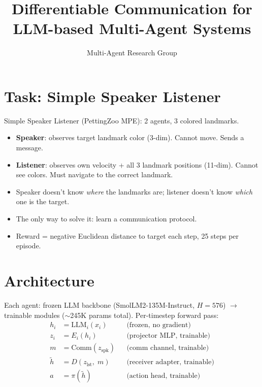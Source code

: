 \documentclass[11pt,a4paper]{article}
\title{\Large\bfseries Differentiable Communication for LLM-based Multi-Agent Systems}
\author{Multi-Agent Research Group}
\date{}
\begin{document}
\maketitle

\section{Task: Simple Speaker Listener}

Simple Speaker Listener (PettingZoo MPE): 2 agents, 3 colored landmarks.

\begin{itemize}[nosep,leftmargin=1.2em]
    \item \textbf{Speaker}: observes target landmark color (3-dim). Cannot move. Sends a message.
    \item \textbf{Listener}: observes own velocity + all 3 landmark positions (11-dim). Cannot see colors. Must navigate to the correct landmark.
    \item Speaker doesn't know \emph{where} the landmarks are; listener doesn't know \emph{which} one is the target.
    \item The only way to solve it: learn a communication protocol.
    \item Reward = negative Euclidean distance to target each step, 25 steps per episode.
\end{itemize}

\section{Architecture}

Each agent: frozen LLM backbone (SmolLM2-135M-Instruct, $H{=}576$) $\to$ trainable modules (${\sim}$245K params total). Per-timestep forward pass:
\begin{align}
    h_i &= \mathrm{LLM}_i(x_i) & & \text{(frozen, no gradient)} \\
    z_i &= E_i(h_i) & & \text{(projector MLP, trainable)} \\
    m   &= \mathrm{Comm}(z_{\mathrm{spk}}) & & \text{(comm channel, trainable)} \\
    \tilde{h} &= D(z_{\mathrm{lst}},\; m) & & \text{(receiver adapter, trainable)} \\
    a   &= \pi(\tilde{h}) & & \text{(action head, trainable)}
\end{align}
\end{document}

